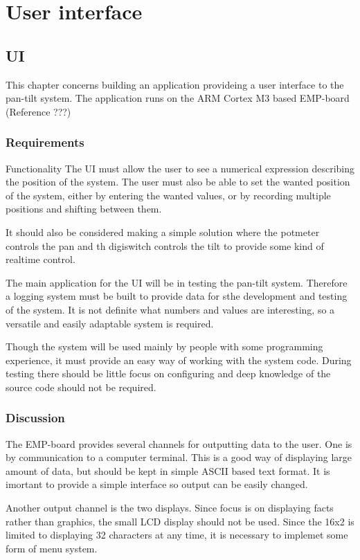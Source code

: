 \chapter{User interface}\label{chap:ui}

\section{UI}
This chapter concerns building an application provideing a user interface to the
pan-tilt system. The application runs on the ARM Cortex M3 based EMP-board
(Reference ???)

\subsection{Requirements}
Functionality The UI must allow the user to see a numerical expression
describing the position of the system. The user must also be able to set the
wanted position of the system, either by entering the wanted values, or by
recording multiple positions and shifting between them.

It should also be considered making a simple solution where the potmeter
controls the pan and th digiswitch controls the tilt to provide some kind of
realtime control.

The main application for the UI will be in testing the pan-tilt system.
Therefore a logging system must be built to provide data for sthe development
and testing of the system. It is not definite what numbers and values are
interesting, so a versatile and easily adaptable system is required.

Though the system will be used mainly by people with some programming
experience, it must provide an easy way of working with the system code.
During testing there should be little focus on configuring and deep knowledge of
the source code should not be required.

\subsection{Discussion}
The EMP-board provides several channels for outputting data to the user. One is
by communication to a computer terminal. This is a good way of displaying large
amount of data, but should be kept in simple ASCII based text format. It is
imortant to provide a simple interface so output can be easily changed.

Another output channel is the two displays. Since focus is on displaying facts
rather than graphics, the small LCD display should not be used. Since the 16x2
is limited to displaying 32 characters at any time, it is necessary to implemet
some form of menu system.
 
